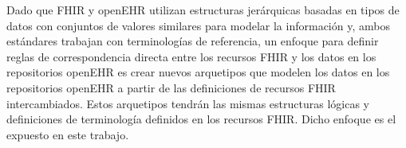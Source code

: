 Dado que FHIR y openEHR utilizan estructuras jerárquicas basadas en tipos de datos con conjuntos de valores similares para modelar la información y, ambos estándares trabajan con terminologías de referencia, un enfoque para definir reglas de correspondencia directa entre los recursos FHIR y los datos en los repositorios openEHR es crear nuevos arquetipos que modelen los datos en los repositorios openEHR a partir de las definiciones de recursos FHIR intercambiados. Estos arquetipos tendrán las mismas estructuras lógicas y definiciones de terminología definidos en los recursos FHIR. Dicho enfoque es el expuesto en este trabajo.
